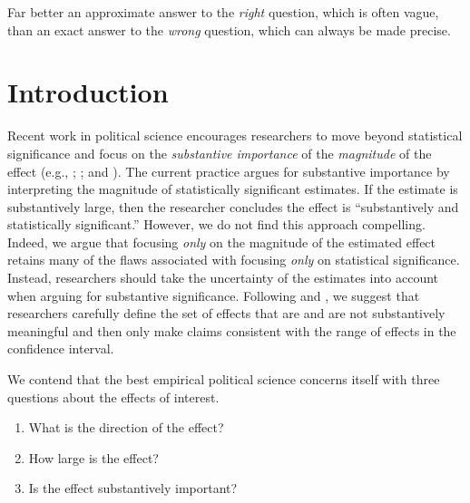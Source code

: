 \documentclass[12pt]{article}
\begin{document}
\epigraph{Far better an approximate answer to the \textit{right} question, which is often vague, than an exact answer to the \textit{wrong} question, which can always be made precise.}{\citet[pp. 13-14]{Tukey1962}}

\thispagestyle{empty}

\newpage
\doublespace

\section*{Introduction}

Recent work in political science encourages researchers to move beyond statistical significance and focus on the \emph{substantive importance} of the \emph{magnitude} of the effect (e.g., \citealt{KingTomzWittenberg2000}; \citealt{HanmerKalkan2013}; and \citealt{EsareyDanneman2014}). The current practice argues for substantive importance by interpreting the magnitude of statistically significant estimates. If the estimate is substantively large, then the researcher concludes the effect is ``substantively and statistically significant.'' However, we do not find this approach compelling. Indeed, we argue that focusing \emph{only} on the magnitude of the estimated effect retains many of the flaws associated with focusing \emph{only} on statistical significance. Instead, researchers should take the uncertainty of the estimates into account when arguing for substantive significance. Following \cite{Gross2014} and \cite{Rainey2014}, we suggest that researchers carefully define the set of effects that are and are not substantively meaningful and then only make claims consistent with the range of effects in the confidence interval.

We contend that the best empirical political science concerns itself with three questions about the effects of interest. 

\begin{enumerate}
\item What is the direction of the effect?
\item How large is the effect?
\item Is the effect substantively important?
\end{enumerate}
\end{document}
